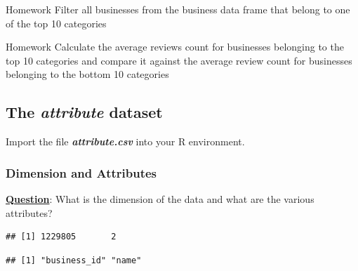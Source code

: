 \documentclass[12pt]{book}\usepackage{knitr}
\begin{document}
\begin{DIY}{Homework}
\noindent Filter all businesses from the business data frame that belong to one of the top 10 categories
\end{DIY}

\begin{DIY}{Homework}
\noindent Calculate the average reviews count for businesses belonging to the top 10 categories and compare it against the average review count for businesses belonging to the bottom 10 categories
\end{DIY}

\subsection{The \textbf{\emph{attribute}} dataset}
\noindent Import the file \emph{\textbf{attribute.csv}} into your R environment.  


\subsubsection{Dimension and Attributes}
\noindent \textbf{\underline{Question}}: What is the dimension of the data and what are the various attributes?
\begin{knitrout}
\color{fgcolor}\begin{kframe}
\begin{alltt}
\end{alltt}
\begin{verbatim}
## [1] 1229805       2
\end{verbatim}
\begin{alltt}
\end{alltt}
\begin{verbatim}
## [1] "business_id" "name"
\end{verbatim}
\begin{alltt}
\end{alltt}
\end{kframe}
\end{knitrout}
\end{document}
